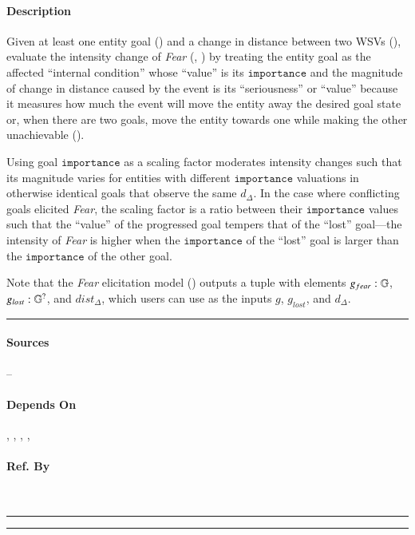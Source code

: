 \paragraph{Description} Given at least one entity goal () and a
change in distance between two WSVs
(), evaluate the intensity change of
\textit{Fear} (, )
by treating the entity goal as the affected ``internal condition'' whose
``value'' is its $\mathtt{importance}$ and the magnitude of change in distance
caused by the event is its ``seriousness'' or ``value'' because it measures how
much the event will move the entity away the desired goal state or, when there
are two goals, move the entity towards one while making the other unachievable
().

Using goal $\mathtt{importance}$ as a scaling factor moderates intensity
changes such that its magnitude varies for entities with different
$\mathtt{importance}$ valuations in otherwise identical goals that observe the
same $d_\Delta$. In the case where conflicting goals elicited \textit{Fear},
the scaling factor is a ratio between their $\mathtt{importance}$ values such
that the ``value'' of the progressed goal tempers that of the ``lost''
goal---the intensity of \textit{Fear} is higher when the $\mathtt{importance}$
of the ``lost'' goal is larger than the $\mathtt{importance}$ of the other goal.

Note that the \textit{Fear} elicitation model () outputs a
tuple with elements $g_{fear} : \mathbb{G}$, $g_{lost} : \mathbb{G}^?$, and
$\mathit{dist}_\Delta$, which users can use as the inputs $g$, $g_{lost}$, and
$d_\Delta$. \\\hrule

\paragraph{Sources} --

\paragraph{Depends On} ,
, ,
, 

\paragraph{Ref. By}  \\\hrule\vspace{0.5mm}\hrule

